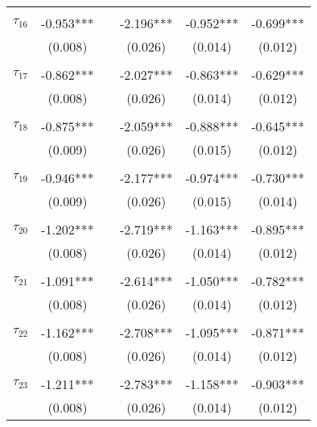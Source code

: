 \begin{tabular}{@{\extracolsep{-5pt}}lccccc}
                &           &&           &           &           \\[-2.1ex]
$\tau_{16}$     & -0.953*** && -2.196*** & -0.952*** & -0.699*** \\
                &  (0.008)  &&  (0.026)  &  (0.014)  &  (0.012)  \\
                &           &&           &           &           \\[-2.1ex]
$\tau_{17}$     & -0.862*** && -2.027*** & -0.863*** & -0.629*** \\
                &  (0.008)  &&  (0.026)  &  (0.014)  &  (0.012)  \\
                &           &&           &           &           \\[-2.1ex]
$\tau_{18}$     & -0.875*** && -2.059*** & -0.888*** & -0.645*** \\
                &  (0.009)  &&  (0.026)  &  (0.015)  &  (0.012)  \\
                &           &&           &           &           \\[-2.1ex]
$\tau_{19}$     & -0.946*** && -2.177*** & -0.974*** & -0.730*** \\
                &  (0.009)  &&  (0.026)  &  (0.015)  &  (0.014)  \\
                &           &&           &           &           \\[-2.1ex]
$\tau_{20}$     & -1.202*** && -2.719*** & -1.163*** & -0.895*** \\
                &  (0.008)  &&  (0.026)  &  (0.014)  &  (0.012)  \\
                &           &&           &           &           \\[-2.1ex]
$\tau_{21}$     & -1.091*** && -2.614*** & -1.050*** & -0.782*** \\
                &  (0.008)  &&  (0.026)  &  (0.014)  &  (0.012)  \\
                &           &&           &           &           \\[-2.1ex]
$\tau_{22}$     & -1.162*** && -2.708*** & -1.095*** & -0.871*** \\
                &  (0.008)  &&  (0.026)  &  (0.014)  &  (0.012)  \\
                &           &&           &           &           \\[-2.1ex]
$\tau_{23}$     & -1.211*** && -2.783*** & -1.158*** & -0.903*** \\
                &  (0.008)  &&  (0.026)  &  (0.014)  &  (0.012)  \\

\end{tabular}
